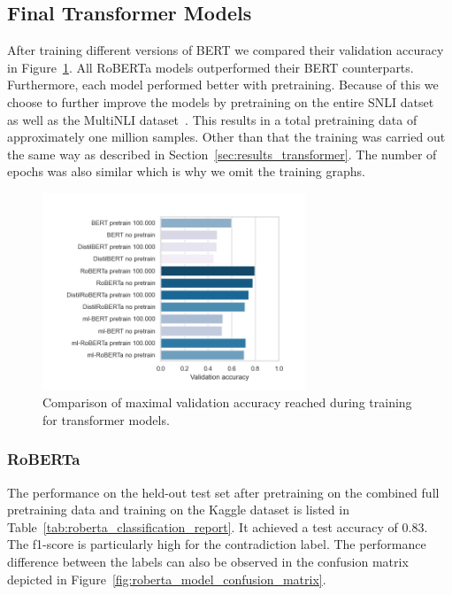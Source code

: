 \documentclass[acmsmall,nonacm]{acmart}
\begin{document}
\subsection{Final Transformer Models} \label{sec:result_final_transformer_models}
After training different versions of BERT we compared their validation accuracy in Figure~\ref{fig:transformer_comparison}. All RoBERTa models outperformed their BERT counterparts. Furthermore, each model performed better with pretraining. Because of this we choose to further improve the models by pretraining on the entire SNLI datset~\cite{snli-bowman2015} as well as the MultiNLI dataset~\cite{mlni-N18-1101}. This results in a total pretraining data of approximately one million samples. Other than that the training was carried out the same way as described in Section~\ref{sec:results_transformer}. The number of epochs was also similar which is why we omit the training graphs.

\begin{figure}[H]
  \includegraphics[width=0.7\textwidth]{assets/bert_roberta_comparison.png}
  \caption{Comparison of maximal validation accuracy reached during training for transformer models.}
  \label{fig:transformer_comparison}
\end{figure}


\subsubsection{RoBERTa}
The performance on the held-out test set after pretraining on the combined full pretraining data and training on the Kaggle dataset is listed in Table~\ref{tab:roberta_classification_report}. It achieved a test accuracy of 0.83. The f1-score is particularly high for the contradiction label. The performance difference between the labels can also be observed in the confusion matrix depicted in Figure~\ref{fig:roberta_model_confusion_matrix}.
\end{document}
